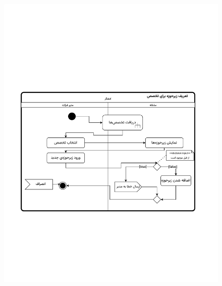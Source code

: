 \begin{figure}[ht!]
	\centering
	\includegraphics[scale=0.8, page=1]{figs/OOD-activity-zirhozeh.pdf}
\end{figure}
\FloatBarrier
\newpage


